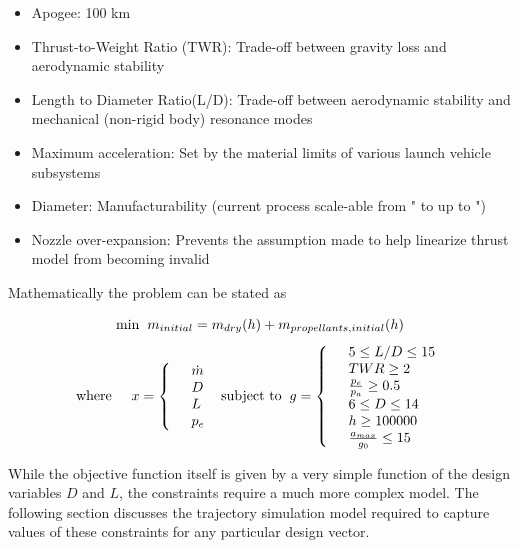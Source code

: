 \documentclass[]{aiaa-tc}%
\begin{document}
\begin{itemize}
\item Apogee: 100 km
\item Thrust-to-Weight Ratio (TWR): Trade-off between gravity loss and aerodynamic stability
\item Length to Diameter Ratio(L/D): Trade-off between aerodynamic stability and mechanical (non-rigid body) resonance modes
\item Maximum acceleration: Set by the material limits of various launch vehicle subsystems
\item Diameter: Manufacturability (current process scale-able from " to up to ") 
\item Nozzle over-expansion: Prevents the assumption made to help linearize thrust model from becoming invalid
\end{itemize}

Mathematically the problem can be stated as

\[ \mbox{min} \hspace{2 mm} m_{initial} = m_{dry}(h) + m_{propellants,  initial}(h) \]
\begin{eqnarray*} \mbox{where} \hspace{5 mm} \begin{split}x = \left\{ \begin{array}{ll}      & \dot{m}\\
          & D\\
          & L\\
          & p_e \end{array} \right. 
          \end{split} \hspace{2 mm} \mbox{subject to} \hspace{2 mm} \begin{split}
          g = \left\{ \begin{array}{ll}
          & 5 \leq L/D \leq 15\\
          & TWR \geq 2\\
          & \frac{p_e}{p_a} \geq 0.5\\
          & 6 \leq D \leq 14\\
          & h \geq 100000\\
          & \frac{a_{max}}{g_0} \leq 15 \end{array} \right. \end{split}\end{eqnarray*}

While the objective function itself is given by a very simple function of the design variables $D$ and $L$, the constraints require a much more complex model. The following section discusses the trajectory simulation model required to capture values of these constraints for any particular design vector.
\end{document}
